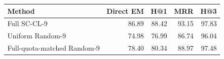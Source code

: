 \begin{tabular}{lrrrr}
\toprule
Method & Direct EM & H@1 & MRR & H@3 \\
\midrule
Full SC-CL-9 & 86.89 & 88.42 & 93.15 & 97.83 \\
Uniform Random-9 & 74.98 & 76.99 & 86.74 & 96.04 \\
Full-quota-matched Random-9 & 78.40 & 80.34 & 88.97 & 97.48 \\
\bottomrule
\end{tabular}
